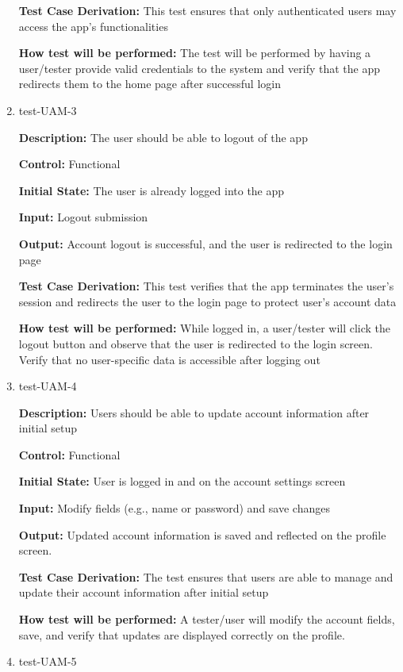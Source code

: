 \documentclass[12pt, titlepage]{article}
\begin{document}
\begin{enumerate}
\textbf{Test Case Derivation:} This test ensures that only authenticated users may access the app's functionalities

\textbf{How test will be performed:} The test will be performed by having a user/tester provide valid credentials to the system and verify that the app redirects them to the home page after successful login

\item{test-UAM-3\\}

\textbf{Description:} The user should be able to logout of the app

\textbf{Control:} Functional
					
\textbf{Initial State:} The user is already logged into the app
					
\textbf{Input:} Logout submission
					
\textbf{Output:} Account logout is successful, and the user is redirected to the login page

\textbf{Test Case Derivation:} This test verifies that the app terminates the user's session and redirects the user to the login page to protect user's account data

\textbf{How test will be performed:} While logged in, a user/tester will click the logout button and observe that the user is redirected to the login screen. Verify that no user-specific data is accessible after logging out

\item{test-UAM-4}

\textbf{Description:} Users should be able to update account information after initial setup

\textbf{Control:} Functional

\textbf{Initial State:} User is logged in and on the account settings screen

\textbf{Input:} Modify fields (e.g., name or password) and save changes

\textbf{Output:} Updated account information is saved and reflected on the profile screen.

\textbf{Test Case Derivation:} The test ensures that users are able to manage and update their account information after initial setup

\textbf{How test will be performed:} A tester/user will modify the account fields, save, and verify that updates are displayed correctly on the profile.

\item{test-UAM-5}


\end{enumerate}
\end{document}
